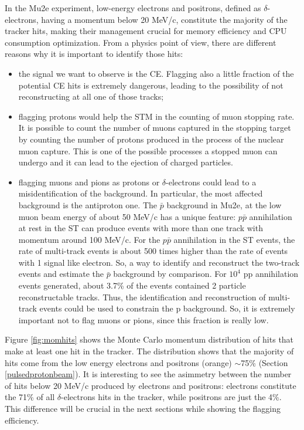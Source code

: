 In the Mu2e experiment, low-energy electrons and positrons, defined as $\delta$-electrons, having a momentum below 20 MeV/c, 
constitute the majority of the tracker hits, 
making their management crucial for memory efficiency and CPU consumption optimization. 
From a physics point of view, there are different reasons why it is important to identify those hits:
\begin{itemize}
    \item the signal we want to observe is the CE. Flagging also a little fraction of the 
    potential CE hits is extremely dangerous, 
    leading to the possibility of not reconstructing at all one of those tracks;
    \item flagging protons would help the STM in the counting of muon stopping rate.
    It is possible to count the number
    of muons captured in the stopping target by counting the number of 
    protons produced in the process of the nuclear muon capture. This is one of
    the possible processes a stopped muon can undergo and it can lead to the
    ejection of charged particles.
    \item flagging muons and pions as protons or $\delta$-electrons could lead to a misidentification of 
    the background. In particular, the most affected background is the antiproton one. 
    The $\bar{p}$ background in Mu2e, at the low muon beam energy of about 50 MeV/c has a
    unique feature: $p\bar{p}$ annihilation at rest in the ST can produce events with more than one track
    with momentum around 100 MeV/c. For the $p\bar{p}$ annihilation in the ST events, the rate of multi-track 
    events is about 500 times higher than the rate of events
    with 1 signal like electron. So, a way to identify and reconstruct the two-track events
    and estimate the $\bar{p}$ background by comparison. For $10^4$ pp annihilation 
    events generated, about 3.7\% of the events contained 2 particle reconstructable tracks.
    Thus, the identification and reconstruction of multi-track events could be used to constrain the
    p background. So, it is extremely important not to flag muons or pions, since this fraction is really low.
\end{itemize}


Figure \ref{fig:momhits} shows the Monte Carlo momentum distribution of hits that make at least 
one hit in the tracker. The distribution shows that the majority of hits come from the low energy 
electrons and positrons (orange) $\sim$75\% (Section \ref{pulsedprotonbeam}). 
It is interesting to see the asimmetry between the number of hits below 20 MeV/c produced by electrons and positrons: 
electrons constitute the 71\% of all $\delta$-electrons hits in the tracker, while positrons are just the 4\%.
This difference will be crucial in the next sections while showing the flagging efficiency.

